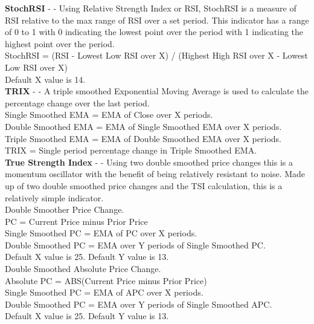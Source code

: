 \documentclass[conference]{IEEEtran}
\begin{document}

\noindent
\textbf{StochRSI} - \cite{Chande1994} - Using Relative Strength Index or RSI, StochRSI is a measure of RSI relative to the max range of RSI over a set period. This indicator has a range of 0 to 1 with 0 indicating the lowest point over the period with 1 indicating the highest point over the period.\\

\noindent
StochRSI = (RSI - Lowest Low RSI over X) / (Highest High RSI over X - Lowest Low RSI over X)\\
Default X value is 14.\\

\noindent
\textbf{TRIX} - \cite{Hutson1983} - A triple smoothed Exponential Moving Average is used to calculate the percentage change over the last period.\\

\noindent
Single Smoothed EMA = EMA of Close over X periods.\\
Double Smoothed EMA = EMA of Single Smoothed EMA over X periods.\\
Triple Smoothed EMA = EMA of Double Smoothed EMA over X periods.\\
TRIX = Single period percentage change in Triple Smoothed EMA. \\

\noindent
\textbf{True Strength Index} - \cite{Blau1995} - Using two double smoothed price changes this is a momentum oscillator with the benefit of being relatively resistant to noise. Made up of two double smoothed price changes and the TSI calculation, this is a relatively simple indicator.\\

\noindent
Double Smoother Price Change.\\
PC = Current Price minus Prior Price\\
Single Smoothed PC = EMA of PC over X periods.\\
Double Smoothed PC = EMA over Y periods of Single Smoothed PC.\\
Default X value is 25. Default Y value is 13.\\

\noindent
Double Smoothed Absolute Price Change. \\
Absolute PC = ABS(Current Price minus Prior Price)\\
Single Smoothed PC = EMA of APC over X periods.\\
Double Smoothed PC = EMA over Y periods of Single Smoothed APC.\\
Default X value is 25. Default Y value is 13.\\
\end{document}
